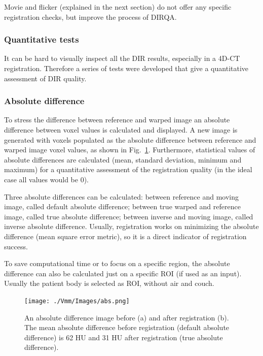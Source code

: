 Movie and flicker (explained in the next section) do not offer any specific registration checks, but improve the process of DIRQA.

\newpage
\subsubsection{Quantitative tests}

It can be hard to visually inspect all the DIR results, especially in a 4D-CT registration. Therefore a series of tests were developed that give a quantitative assessment of DIR quality.

\subsubsection{Absolute difference}

To stress the difference between reference and warped image an absolute difference between voxel values is calculated and displayed. 
A new image is generated with voxels populated as the absolute difference between reference and warped image voxel values, as shown in Fig.~\ref{absDiff}.
Furthermore, statistical values of absolute differences are calculated (mean, standard deviation, minimum and maximum) 
for a quantitative assessment of the registration quality (in the ideal case all values would be 0).

Three absolute differences can be calculated: between reference and moving image, called default absolute difference; between true warped and reference image, called true absolute difference; between inverse and moving image, called
inverse absolute difference. Usually, registration works on minimizing the absolute difference (mean square error metric), so it is a direct indicator
of registration success.

To save computational time or to focus on a specific region, the absolute difference can also be calculated just on a specific ROI (if used as an input). Usually the patient body is selected as ROI, without air and couch.


\begin{figure}[H]
	\begin{center}		
		\texttt{[image: ./Vmm/Images/abs.png]}
		\caption{An absolute difference image before (a) and after registration (b). The mean absolute difference before registration (default absolute difference) is 62 HU and 31 HU after registration (true absolute difference).}
		\label{absDiff}
	\end{center}
\end{figure}

